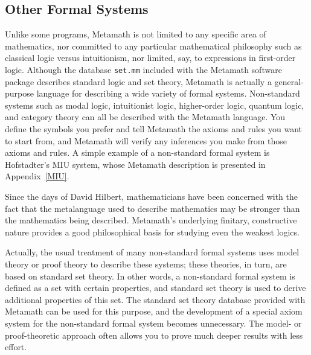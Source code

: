\subsection{Other Formal Systems}

Unlike some programs, Metamath is not limited to any specific
area of mathematics, nor committed to any particular mathematical philosophy
such as classical logic versus intuitionism, nor limited, say, to expressions
in first-order logic.  Although the database \texttt{set.mm} included with the
Metamath software package describes standard logic and set theory, Meta\-math
is actually a general-purpose language for describing a wide variety of formal
systems.  Non-standard systems such as modal
logic, intuitionist logic, higher-order
logic, quantum logic, and
category theory can all be described with the Metamath
language.  You define the symbols you prefer and tell Metamath the axioms and
rules you want to start from, and Metamath will verify any inferences you make
from those axioms and rules.  A simple example of a non-standard formal system
is Hofstadter's MIU system,
whose Metamath description is presented in Appendix~\ref{MIU}.

Since the days of David Hilbert, mathematicians have
been concerned with the fact that the metalanguage used to
describe mathematics may be stronger than the mathematics being described.
Metamath's underlying finitary,
constructive nature provides a good philosophical basis for studying even the
weakest logics.

Actually, the usual treatment of many non-standard formal systems uses model theory or proof theory to describe these systems; these theories, in turn, are based on
standard set theory.  In other words, a non-standard formal system is defined
as a set with certain properties, and standard set theory is used to derive
additional properties of this set.  The standard set theory database provided
with Metamath can be used for this purpose, and the development of a special
axiom system for the non-standard formal system becomes unnecessary.  The
model- or proof-theoretic approach often allows you to prove much deeper
results with less effort.

